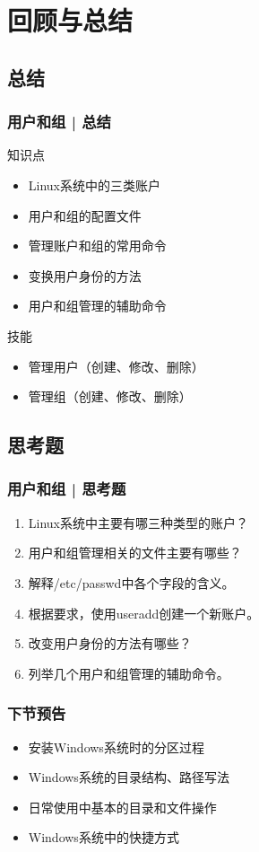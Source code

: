 \section{回顾与总结}
\subsection{总结}
\begin{frame}[label=current]
  \frametitle{用户和组 | 总结}
  \begin{block}{知识点}
    \begin{itemize}
      \item Linux系统中的三类账户
      \item 用户和组的配置文件
      \item 管理账户和组的常用命令
      \item 变换用户身份的方法
      \item 用户和组管理的辅助命令
    \end{itemize}
  \end{block}
  \begin{block}{技能}
    \begin{itemize}
      \item 管理用户（创建、修改、删除）
      \item 管理组（创建、修改、删除）
    \end{itemize}
  \end{block}
\end{frame}

\subsection{思考题}
\begin{frame}
  \frametitle{用户和组 | 思考题}
  \begin{enumerate}
    \item Linux系统中主要有哪三种类型的账户？
    \item 用户和组管理相关的文件主要有哪些？
    \item 解释/etc/passwd中各个字段的含义。
    \item 根据要求，使用useradd创建一个新账户。
    \item 改变用户身份的方法有哪些？
    \item 列举几个用户和组管理的辅助命令。
  \end{enumerate}
\end{frame}

\begin{frame}
  \frametitle{下节预告}
  \begin{itemize}
    \item 安装Windows系统时的分区过程
    \item Windows系统的目录结构、路径写法
    \item 日常使用中基本的目录和文件操作
    \item Windows系统中的快捷方式
  \end{itemize}
\end{frame}


